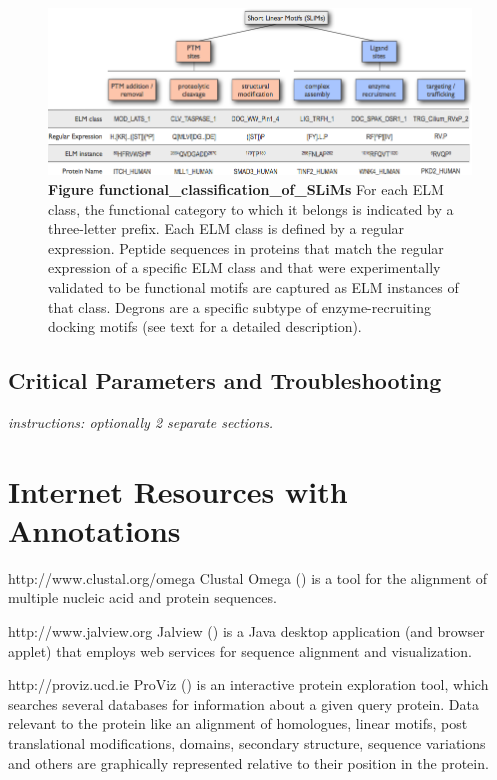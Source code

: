 \begin{figure}[h!]
\centering
\includegraphics[width=\textwidth]{Figures/Introduction/functional_classification_of_SLiMs.png}
\caption{
\textbf{Figure functional\_classification\_of\_SLiMs} For each ELM class, the
functional category to which it belongs is indicated by a three-letter prefix.
Each ELM class is defined by a regular expression. Peptide sequences in
proteins that match the regular expression of a specific ELM class and that
were experimentally validated to be functional motifs are captured as ELM
instances of that class. Degrons are a specific subtype of enzyme-recruiting
docking motifs (see text for a detailed description).
}
\end{figure}

\subsection*{Critical Parameters and
Troubleshooting}\label{critical-parameters-and-troubleshooting}

\emph{instructions: optionally 2 separate sections.}

\section*{Internet Resources with
Annotations}\label{internet-resources-with-annotations}

http://www.clustal.org/omega Clustal Omega (\cite{21988835}) is a tool
for the alignment of multiple nucleic acid and protein sequences.

http://www.jalview.org Jalview (\cite{19151095}) is a Java desktop
application (and browser applet) that employs web services for sequence
alignment and visualization.

http://proviz.ucd.ie ProViz (\cite{27085803}) is an interactive protein
exploration tool, which searches several databases for information about
a given query protein. Data relevant to the protein like an alignment of
homologues, linear motifs, post translational modifications, domains,
secondary structure, sequence variations and others are graphically
represented relative to their position in the protein.
